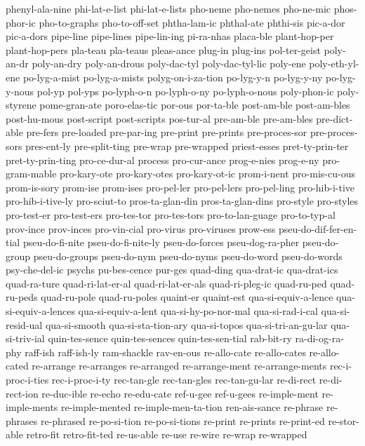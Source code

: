 {phenyl-ala-nine
phi-lat-e-list
phi-lat-e-lists
pho-neme
pho-nemes
pho-ne-mic
phos-phor-ic
pho-to-graphs
pho-to-off-set
phtha-lam-ic
phthal-ate
phthi-sis
pic-a-dor
pic-a-dors
pipe-line
pipe-lines
pipe-lin-ing
pi-ra-nhas
placa-ble
plant-hop-per
plant-hop-pers
pla-teau
pla-teaus
pleas-ance
plug-in
plug-ins
pol-ter-geist
poly-an-dr
poly-an-dry
poly-an-drous
poly-dac-tyl
poly-dac-tyl-lic
poly-ene
poly-eth-yl-ene
po-lyg-a-mist
po-lyg-a-mists
polyg-on-i-za-tion
po-lyg-y-n
po-lyg-y-ny
po-lyg-y-nous
pol-yp
pol-yps
po-lyph-o-n
po-lyph-o-ny
po-lyph-o-nous
poly-phon-ic
poly-styrene
pome-gran-ate
poro-elas-tic
por-ous
por-ta-ble
post-am-ble
post-am-bles
post-hu-mous
post-script
post-scripts
pos-tur-al
pre-am-ble
pre-am-bles
pre-dict-able
pre-fers
pre-loaded
pre-par-ing
pre-print
pre-prints
pre-proces-sor
pre-proces-sors
pres-ent-ly
pre-split-ting
pre-wrap
pre-wrapped
priest-esses
pret-ty-prin-ter
pret-ty-prin-ting
pro-ce-dur-al
process
pro-cur-ance
prog-e-nies
prog-e-ny
pro-gram-mable
pro-kary-ote
pro-kary-otes
pro-kary-ot-ic
prom-i-nent
pro-mis-cu-ous
prom-is-sory
prom-ise
prom-ises
pro-pel-ler
pro-pel-lers
pro-pel-ling
pro-hib-i-tive
pro-hib-i-tive-ly
pro-sciut-to
pros-ta-glan-din
pros-ta-glan-dins
pro-style
pro-styles
pro-test-er
pro-test-ers
pro-tes-tor
pro-tes-tors
pro-to-lan-guage
pro-to-typ-al
prov-ince
prov-inces
pro-vin-cial
pro-virus
pro-viruses
prow-ess
pseu-do-dif-fer-en-tial
pseu-do-fi-nite
pseu-do-fi-nite-ly
pseu-do-forces
pseu-dog-ra-pher
pseu-do-group
pseu-do-groups
pseu-do-nym
pseu-do-nyms
pseu-do-word
pseu-do-words
psy-che-del-ic
psychs
pu-bes-cence
pur-ges
quad-ding
qua-drat-ic
qua-drat-ics
quad-ra-ture
quad-ri-lat-er-al
quad-ri-lat-er-als
quad-ri-pleg-ic
quad-ru-ped
quad-ru-peds
quad-ru-pole
quad-ru-poles
quaint-er
quaint-est
qua-si-equiv-a-lence
qua-si-equiv-a-lences
qua-si-equiv-a-lent
qua-si-hy-po-nor-mal
qua-si-rad-i-cal
qua-si-resid-ual
qua-si-smooth
qua-si-sta-tion-ary
qua-si-topos
qua-si-tri-an-gu-lar
qua-si-triv-ial
quin-tes-sence
quin-tes-sences
quin-tes-sen-tial
rab-bit-ry
ra-di-og-ra-phy
raff-ish
raff-ish-ly
ram-shackle
rav-en-ous
re-allo-cate
re-allo-cates
re-allo-cated
re-arrange
re-arranges
re-arranged
re-arrange-ment
re-arrange-ments
rec-i-proc-i-ties
rec-i-proc-i-ty
rec-tan-gle
rec-tan-gles
rec-tan-gu-lar
re-di-rect
re-di-rect-ion
re-duc-ible
re-echo
re-edu-cate
ref-u-gee
ref-u-gees
re-imple-ment
re-imple-ments
re-imple-mented
re-imple-men-ta-tion
ren-ais-sance
re-phrase
re-phrases
re-phrased
re-po-si-tion
re-po-si-tions
re-print
re-prints
re-print-ed
re-stor-able
retro-fit
retro-fit-ted
re-us-able
re-use
re-wire
re-wrap
re-wrapped
}

